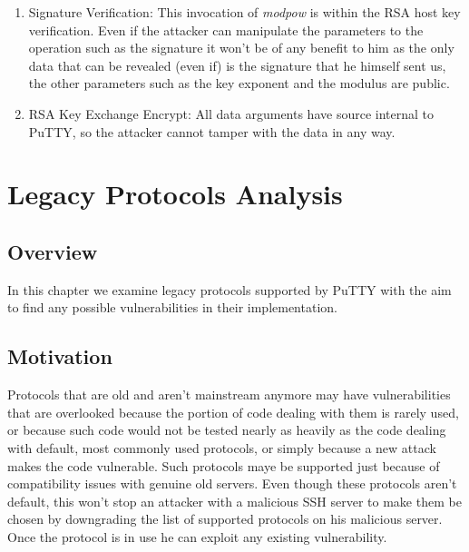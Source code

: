 \documentclass{report}
\begin{document}
\begin{enumerate}
\begin{enumerate}
            \item{Signature Verification}: This invocation of \textit{modpow} is within the RSA host key verification. Even if the attacker can manipulate the parameters to the operation such as the signature it won't be of any benefit to him as the only data that can be revealed (even if) is the signature that he himself sent us, the other parameters such as the key exponent and the modulus are public.
            \item{RSA Key Exchange Encrypt}: All data arguments have source internal to PuTTY, so the attacker cannot tamper with the data in any way.
         \end{enumerate}   
\end{enumerate}    
\chapter{Legacy Protocols Analysis}
\section{Overview}
In this chapter we examine legacy protocols supported by PuTTY with the aim to find any possible vulnerabilities in their implementation.
\section{Motivation}
Protocols that are old and aren't mainstream anymore may have vulnerabilities that are overlooked because the portion of code dealing with them is rarely used, or because such code would not be tested nearly as heavily as the code dealing with default, most commonly used protocols, or simply because a new attack makes the code vulnerable. Such protocols maye be supported just because of compatibility issues with genuine old servers. Even though these protocols aren't default, this won't stop an attacker with a malicious SSH server to make them be chosen by downgrading the list of supported protocols on his malicious server. Once the protocol is in use he can exploit any existing vulnerability.
\clearpage
\end{document}

